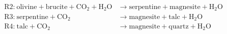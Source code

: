 \begin{equation}
    \begin{split}
    \text{R2:}~ \text{olivine} + \text{brucite} + \text{CO}_2 + \text{H}_2\text{O}
    &\rightarrow
    \text{serpentine} + \text{magnesite} + \text{H}_2\text{O}
    \\
    \text{R3:}~ \text{serpentine} + \text{CO}_2
    &\rightarrow
    \text{magnesite} + \text{talc} + \text{H}_2\text{O}
    \\
    \text{R4:}~ \text{talc} + \text{CO}_2
    &\rightarrow
    \text{magnesite} + \text{quartz} + \text{H}_2\text{O}
    \end{split}
    \label{eq:carbonation}
\end{equation}
